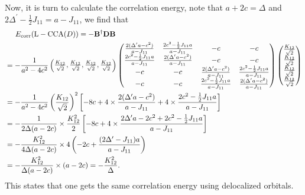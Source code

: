 \documentclass[a4paper]{book}
\newcounter{solution}[chapter]
\newcommand{\corr}{{\rm corr}}
\newcommand{\B}{{\bf B}}
\newcommand{\D}{{\bf D}}
\begin{document}
\begin{solution}
\begin{itemize}
	Now, it is turn to calculate the correlation energy, note that $a+2c=\Delta$ and $2\Delta^\prime - \frac{1}{2} J_{11} = a - J_{11}$, we find that
	\begin{align*}
		&\hspace{1.4em} E_\corr( {\rm L-CCA}(D) ) = -\B^\dagger \D \B \\
		&= - \frac{ 1 }{ a^2 - 4c^2 } \begin{pmatrix}
		  	\frac{ K_{12} }{ \sqrt{2} } , \frac{ K_{12} }{ \sqrt{2} } , \frac{ K_{12} }{ \sqrt{2} } , \frac{ K_{12} }{ \sqrt{2} } 
		  \end{pmatrix}  \begin{pmatrix}
			\frac{ 2(\Delta^\prime a - c^2) }{ a - J_{11} } & \frac{ 2c^2 - \frac{1}{2} J_{11} a }{ a - J_{11} } & -c & -c \\
			\frac{ 2c^2 - \frac{1}{2} J_{11} a }{ a - J_{11} } & \frac{ 2(\Delta^\prime a - c^2) }{ a - J_{11} } & -c & -c \\
			-c & -c & \frac{ 2(\Delta^\prime a - c^2) }{ a - J_{11} } & \frac{ 2c^2 - \frac{1}{2} J_{11} a }{ a - J_{11} } \\
			-c & -c & \frac{ 2c^2 - \frac{1}{2} J_{11} a }{ a - J_{11} } & \frac{ 2(\Delta^\prime a - c^2) }{ a - J_{11} }
		\end{pmatrix} \begin{pmatrix}
		  	\frac{ K_{12} }{ \sqrt{2} } \\ \frac{ K_{12} }{ \sqrt{2} } \\ \frac{ K_{12} }{ \sqrt{2} } \\ \frac{ K_{12} }{ \sqrt{2} } \end{pmatrix} \\
		&= - \frac{ 1 }{ a^2 - 4c^2 } \left( \frac{ K_{12} }{ \sqrt{2} } \right)^2 \left[ -8c + 4 \times \frac{ 2(\Delta^\prime a - c^2) }{ a - J_{11} } + 4 \times \frac{ 2c^2 - \frac{1}{2} J_{11} a }{  a - J_{11} } \right] \\
		&= - \frac{ 1 }{ 2\Delta ( a - 2c ) } \times \frac{ K^2_{12} }{ 2 } \left[ -8c + 4 \times \frac{ 2 \Delta^\prime a - 2 c^2 + 2c^2 - \frac{1}{2} J_{11} a }{ a - J_{11} } \right] \\
		&= - \frac{ K^2_{12} }{ 4\Delta ( a - 2c ) } \times 4 \left( -2c + \frac{ ( 2\Delta^\prime - J_{11} ) a }{ a - J_{11} } \right) \\
		&= - \frac{ K^2_{12} }{ \Delta ( a - 2c ) } \times ( a - 2c ) = - \frac{ K^2_{12} }{ \Delta } .
	\end{align*}
	This states that one gets the same correlation energy using delocalized orbitals.

	\end{itemize}
	
	\end{solution}
	
\end{document}
